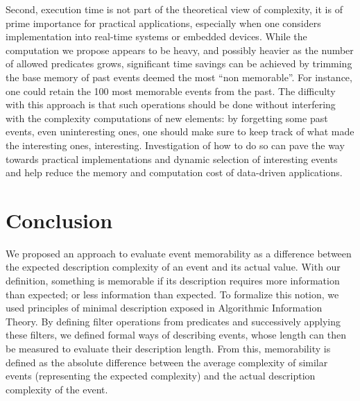 \documentclass[entropy,article,submit,moreauthors,pdftex]{Definitions/mdpi}
\begin{document}
Second, execution time is not part of the theoretical view of complexity, it
is of prime importance for practical applications, especially when one considers
implementation into real-time systems or embedded devices. While the computation
we propose appears to be heavy, and possibly heavier as the number of allowed
predicates grows, significant time savings can be achieved by trimming the base
memory of past events deemed the most ``non memorable''. For instance, one could retain
the 100 most memorable events from the past. The difficulty with
this approach is that such operations should be done without interfering with the complexity computations of new elements: by forgetting some
past events, even uninteresting ones, one should make sure to keep track of what
made the interesting ones, interesting. Investigation of how to do so can pave
the way towards practical implementations and dynamic selection of interesting
events and help reduce the memory and computation cost of data-driven applications.


\section{Conclusion}

We proposed an approach to evaluate event memorability as a difference between the expected description complexity of an event and its actual value. With our definition, something is memorable if its description requires more information than expected; or less information than expected. To formalize this notion, we used principles of minimal description exposed in Algorithmic Information Theory. By defining filter operations from predicates and successively applying these filters, we defined formal ways of describing events, whose length can then be measured to evaluate their description length. From this, memorability is defined as the absolute difference between the average complexity of similar events (representing the expected complexity) and the actual description complexity of the event.


\end{document}
